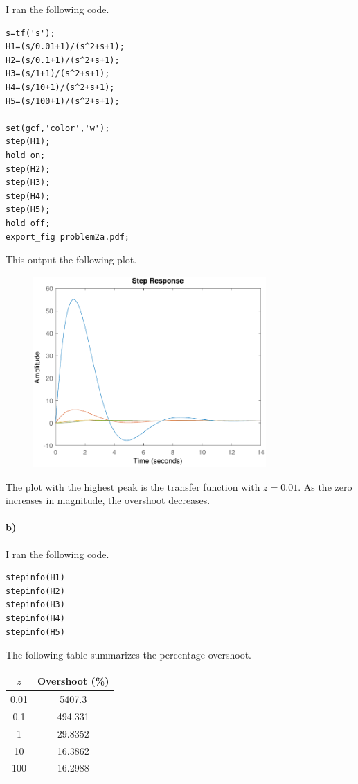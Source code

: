 \documentclass[12pt]{article}
\begin{document}
I ran the following code.
\begin{verbatim}
s=tf('s');
H1=(s/0.01+1)/(s^2+s+1);
H2=(s/0.1+1)/(s^2+s+1);
H3=(s/1+1)/(s^2+s+1);
H4=(s/10+1)/(s^2+s+1);
H5=(s/100+1)/(s^2+s+1);

set(gcf,'color','w');
step(H1);
hold on;
step(H2);
step(H3);
step(H4);
step(H5);
hold off;
export_fig problem2a.pdf;
\end{verbatim}
This output the following plot.
\begin{figure}[H]
    \begin{center}
        \includegraphics[width=3.5in]{problem2a.pdf}
    \end{center}
\end{figure}
The plot with the highest peak is the transfer function with \(z=0.01\). As the zero
increases in magnitude, the overshoot decreases.

\paragraph{b)}

I ran the following code.
\begin{verbatim}
stepinfo(H1)
stepinfo(H2)
stepinfo(H3)
stepinfo(H4)
stepinfo(H5)
\end{verbatim}
The following table summarizes the percentage overshoot.
\begin{center}
    \begin{tabular}{c|c}
        \(z\) & Overshoot (\%)\\
        \hline
        0.01 & 5407.3\\
        0.1 & 494.331\\
        1 & 29.8352\\
        10 & 16.3862\\
        100 & 16.2988
    \end{tabular}
\end{center}
\end{document}
